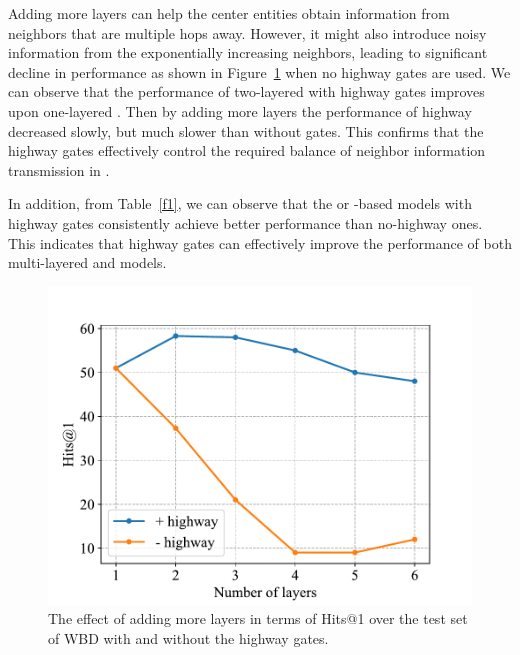 Adding more \HRGCN layers can help the center entities obtain information from neighbors that are multiple hops away. However, it might also introduce noisy information from the exponentially increasing neighbors, leading to significant decline in performance as shown in Figure~\ref{highway} when no highway gates are used. We can observe that the performance of two-layered \RGCNs with highway gates improves upon one-layered \RGCN. Then by adding more layers the performance of highway \RGCNs decreased slowly, but much slower than \RGCNs without gates. This confirms that the highway gates effectively control the required balance of neighbor information transmission in \RGCNs.

In addition, from Table~\ref{f1}, we can observe that the \GCN or \RGCN-based models with highway gates consistently achieve better performance than no-highway ones. This indicates that highway gates can effectively improve the performance of both multi-layered \GCN and \RGCN models.
\begin{figure}
	\centering
	\includegraphics[width=0.8\linewidth]{figures/graph3.pdf}
	\caption{The effect of adding more \RGCN layers in terms of Hits@1 over the test set of WBD with and without the highway gates.}
	\label{highway}
\end{figure}



